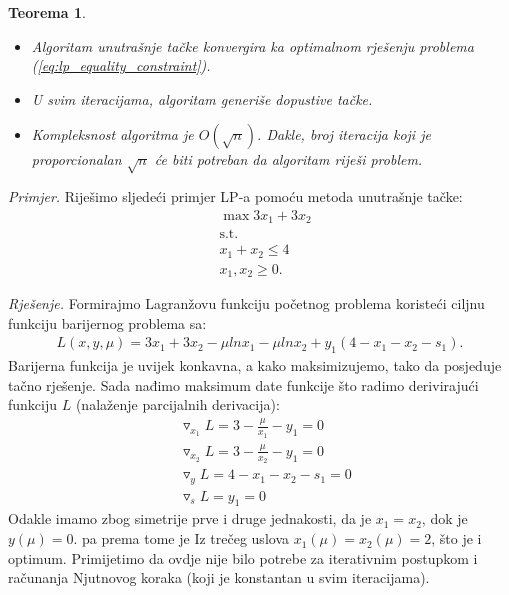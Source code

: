 \documentclass[a4paper, utf8, 11pt, colorlinks]{article}
\newtheorem{thm}{Teorema}
\begin{document}
\begin{thm}
	\begin{itemize}
		\item Algoritam unutrašnje tačke konvergira ka optimalnom rješenju problema (\ref{eq:lp_equality_constraint}). %
		\item U svim iteracijama, algoritam generiše dopustive tačke.
		\item Kompleksnost algoritma je $O(\sqrt{n})$. Dakle,  broj iteracija koji je proporcionalan $\sqrt{n}$ će biti potreban da algoritam riješi problem. 
	\end{itemize}
\end{thm}
\emph{Primjer.} Riješimo sljedeći primjer LP-a pomoću metoda unutrašnje tačke:
\begin{align*}
	&\max 3 x_1 + 3 x_2 \\
	&\mbox{s.t.} \\
	& x_1 + x_2 \leq 4 \\
	& x_1, x_2 \geq 0.
\end{align*}

\emph{Rješenje.}  Formirajmo Lagranžovu funkciju početnog problema koristeći ciljnu funkciju barijernog problema sa:  
\begin{align*}
   L(x, y, \mu) = 	  3 x_1 + 3 x_2 -\mu ln x_1 - \mu ln x_2 + y_1(4- x_1 - x_2 - s_1).  
\end{align*}
Barijerna funkcija je uvijek konkavna, a kako maksimizujemo,  tako da posjeduje tačno rješenje.  Sada nađimo maksimum date funkcije što radimo derivirajući funkciju $L$ (nalaženje parcijalnih derivacija):
\begin{align*}
	 &\triangledown_{x_1} L   =  3 - \frac{\mu}{x_1}  - y_1 = 0 \\
	 &\triangledown_{x_2} L   =  3 - \frac{\mu}{x_2} - y_1 = 0 \\
	 &\triangledown_{y} L   = {4-x_1-x_2 - s_1} = 0 \\
	 &\triangledown_{s} L   = { y_1} = 0 
\end{align*}
Odakle imamo zbog simetrije prve i druge jednakosti, da je  $x_1 = x_2$, dok je $y(\mu) = 0$. pa prema tome je 
Iz trečeg uslova   $x_1(\mu)=x_2(\mu)=2$, što je i optimum. Primijetimo da ovdje nije bilo potrebe za iterativnim postupkom i računanja Njutnovog koraka (koji je konstantan u svim iteracijama). 
\end{document}
